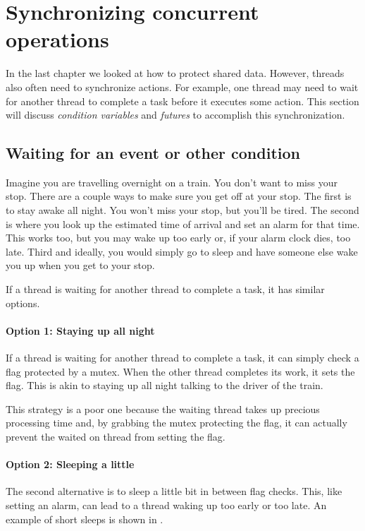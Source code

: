 \section{Synchronizing concurrent operations}
In the last chapter we looked at how to protect shared data. However, threads also often need to synchronize actions. For example, one thread may need to wait for another thread to complete a task before it executes some action. This section will discuss \emph{condition variables} and \emph{futures} to accomplish this synchronization.

\subsection{Waiting for an event or other condition}
Imagine you are travelling overnight on a train. You don't want to miss your stop. There are a couple ways to make sure you get off at your stop. The first is to stay awake all night. You won't miss your stop, but you'll be tired. The second is where you look up the estimated time of arrival and set an alarm for that time. This works too, but you may wake up too early or, if your alarm clock dies, too late. Third and ideally, you would simply go to sleep and have someone else wake you up when you get to your stop.

If a thread is waiting for another thread to complete a task, it has similar options.

\paragraph{Option 1: Staying up all night}
If a thread is waiting for another thread to complete a task, it can simply check a flag protected by a mutex. When the other thread completes its work, it sets the flag. This is akin to staying up all night talking to the driver of the train. 

This strategy is a poor one because the waiting thread takes up precious processing time and, by grabbing the mutex protecting the flag, it can actually prevent the waited on thread from setting the flag. 

\paragraph{Option 2: Sleeping a little}
The second alternative is to sleep a little bit in between flag checks. This, like setting an alarm, can lead to a thread waking up too early or too late. An example of short sleeps is shown in .


